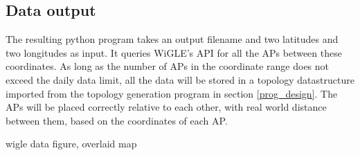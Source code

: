 \subsection{Data output}
The resulting python program takes an output filename and two latitudes and two longitudes as input. It queries WiGLE's API for all the APs between these coordinates.
As long as the number of APs in the coordinate range does not exceed the daily data limit, all the data will be stored in a topology datastructure imported 
from the topology generation program in section \ref{prog_design}. The APs will be placed correctly relative to each other, with real world distance between them,
based on the coordinates of each AP. 

{{wigle data figure, overlaid map}}

